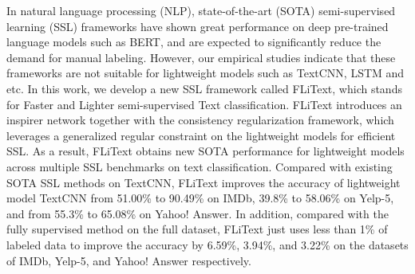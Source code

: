In natural language processing (NLP), state-of-the-art (SOTA) semi-supervised learning (SSL) frameworks have shown great performance on deep pre-trained language models such as BERT, and are expected to significantly reduce the demand for manual labeling. However, our empirical studies indicate that these frameworks are not suitable for lightweight models such as TextCNN, LSTM and etc. In this work, we develop a new SSL framework called FLiText, which stands for Faster and Lighter semi-supervised Text classification. FLiText introduces an inspirer network together with the consistency regularization framework, which leverages a generalized regular constraint on the lightweight models for efficient SSL. As a result, FLiText obtains new SOTA performance for lightweight models across multiple SSL benchmarks on text classification. Compared with existing SOTA SSL methods on TextCNN, FLiText improves the accuracy of lightweight model TextCNN from 51.00\% to 90.49\% on IMDb, 39.8\% to 58.06\% on Yelp-5, and from 55.3\% to 65.08\% on Yahoo! Answer. In addition, compared with the fully supervised method on the full dataset, FLiText just uses less than 1\% of labeled data to improve the accuracy by 6.59\%, 3.94\%, and 3.22\% on the datasets of IMDb, Yelp-5, and Yahoo! Answer respectively.
